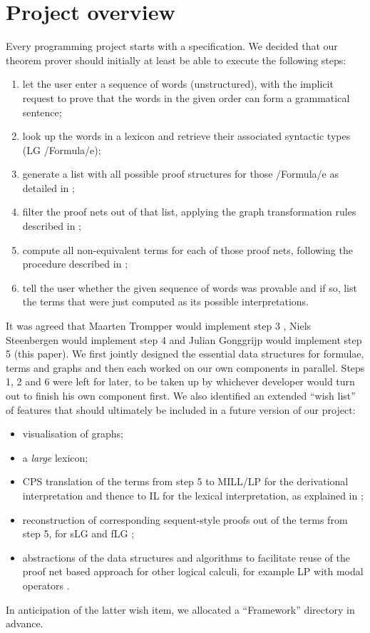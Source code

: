 \documentclass[12pt,a4paper]{article}
\begin{document}
\section{Project overview}\label{sec:project}

Every programming project starts with a specification. We decided that our theorem prover should initially at least be able to execute the following steps:
\begin{enumerate}
    \item let the user enter a sequence of words (unstructured), with the implicit request to prove that the words in the given order can form a grammatical sentence;
    \item look up the words in a lexicon and retrieve their associated syntactic types (LG \hs/Formula/e);
    \item generate a list with all possible proof structures for those \hs/Formula/e as detailed in \cite[p.~4--7]{mm12};
    \item filter the proof nets out of that list, applying the graph transformation rules described in \cite[p.~7--11]{mm12};
    \item compute all non-equivalent terms for each of those proof nets, following the procedure described in \cite[p.~21--26]{mm12};
    \item tell the user whether the given sequence of words was provable and if so, list the terms that were just computed as its possible interpretations.
\end{enumerate}
It was agreed that Maarten Trompper would implement step 3 \cite{maarten}, Niels Steenbergen would implement step 4 \cite{niels} and Julian Gonggrijp would implement step 5 (this paper). We first jointly designed the essential data structures for formulae, terms and graphs and then each worked on our own components in parallel. Steps 1, 2 and 6 were left for later, to be taken up by whichever developer would turn out to finish his own component first. We also identified an extended ``wish list'' of features that should ultimately be included in a future version of our project:
\begin{itemize}
    \item visualisation of graphs;
    \item a \emph{large} lexicon;
    \item CPS translation of the terms from step 5 to MILL/LP for the derivational interpretation and thence to IL for the lexical interpretation, as explained in \cite[p.~14,19--21]{mm12};
    \item reconstruction of corresponding sequent-style proofs out of the terms from step 5, for sLG \cite[p.~3--4]{mm12} and fLG \cite[p.~15--18]{mm12};
    \item abstractions of the data structures and algorithms to facilitate reuse of the proof net based approach for other logical calculi, for example LP with modal operators \cite{qm02}.
\end{itemize}
In anticipation of the latter wish item, we allocated a ``Framework'' directory in advance.
\end{document}

